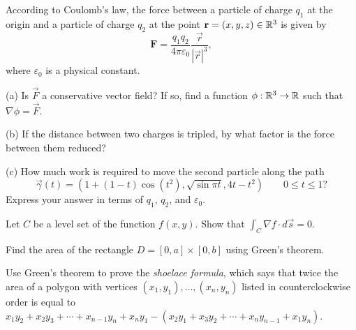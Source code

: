 \documentclass{watsonbook}
\begin{document}
\begin{aexercise}
  According to Coulomb's law, the force between a particle of charge
  $q_1$ at the origin and a particle of charge $q_2$ at the point
  $\mathbf{r} = (x,y,z)\in \mathbb{R}^3$ is given by
  \[
    \mathbf{F} = \frac{q_1q_2}{4\pi
      \varepsilon_0}\frac{\vec{r}}{|\vec{r}|^3},
  \]
  where $\varepsilon_0$ is a physical constant.

  (a) Is $\vec{F}$ a conservative vector field? If so, find a function
  $\phi:\mathbb{R}^3 \to \mathbb{R}$ such that $\nabla \phi = \vec{F}$.

  (b) If the distance between two charges is tripled, by what factor
  is the force between them reduced?

  (c) How much work is required to move the second particle along the
  path
  \[
    \vec{\gamma}(t)=(1+(1-t)\cos(t^2),\sqrt{\sin{\pi t}},4t - t^2)
    \qquad 0\leq t \leq 1?
  \]
  Express your answer in terms of $q_1$, $q_2$, and $\varepsilon_0$.
\end{aexercise}

\begin{aexercise}
  Let $C$ be a level set of the function $f(x,y)$. Show that
  $\int_C \nabla f\cdot d\vec{s} = 0$.
\end{aexercise}




\begin{aexercise}
  Find the area of the rectangle $D=[0,a]\times[0,b]$ using Green's
  theorem.
\end{aexercise}

\begin{aexercise}
  Use Green's theorem to prove the \textit{shoelace
    formula}, which says that twice the area of a polygon with vertices
  $(x_1,y_1),\ldots,(x_n,y_n)$ listed in counterclockwise order is equal
  to 
  $x_1y_2 + x_2 y_3 + \cdots + x_{n-1}y_n + x_n y_1 - (x_2 y_1 + x_3 y_2
  + \cdots + x_{n}y_{n-1}+ x_1 y_n)$.
\end{aexercise}
\end{document}
